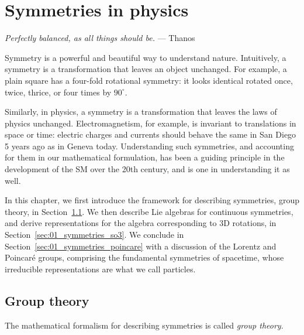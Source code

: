 
\chapter{Symmetries in physics}
\label{sec:01_symmetries}

\begin{center}
	\centering
	\noindent
	\textit{Perfectly balanced, as all things should be.} --- Thanos
\end{center}

Symmetry is a powerful and beautiful way to understand nature.
Intuitively, a symmetry is a transformation that leaves an object unchanged.
For example, a plain square has a four-fold rotational symmetry: it looks identical rotated once, twice, thrice, or four times by $90^{\circ}$.

Similarly, in physics, a symmetry is a transformation that leaves the laws of physics unchanged.
Electromagnetism, for example, is invariant to translations in space or time: electric charges and currents should behave the same in San Diego 5 years ago as in Geneva today.
Understanding such symmetries, and accounting for them in our mathematical formulation, has been a guiding principle in the development of the SM over the 20th century, and is one in understanding it as well.

In this chapter, we first introduce the framework for describing symmetries, group theory, in Section~\ref{sec:01_symmetries_gt}.
We then describe Lie algebras for continuous symmetries, and derive representations for the algebra corresponding to 3D rotations, in Section~\ref{sec:01_symmetries_so3}.
We conclude in Section~\ref{sec:01_symmetries_poincare} with a discussion of the Lorentz and Poincaré groups, comprising the fundamental symmetries of spacetime, whose irreducible representations are what we call particles.

\section{Group theory}
\label{sec:01_symmetries_gt}

The mathematical formalism for describing symmetries is called \textit{group theory}.

